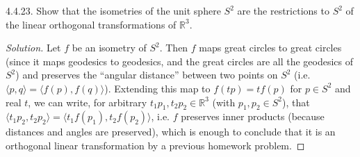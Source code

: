 \documentclass[10pt]{scrartcl}
\providecommand{\RR}{\mathbb R}
\newenvironment{soln}{\begin{proof}[Solution]}{\end{proof}}
\begin{document}
\begin{problem*}4.4.23.
	Show that the isometries of the unit sphere $S^2$ are the restrictions
	to $S^2$ of the linear orthogonal transformations of $\RR^3$.
\end{problem*}

\begin{soln}
	Let $f$ be an isometry of $S^2$.
	Then $f$ maps great circles to great circles
	(since it maps geodesics to geodesics,
	and the great circles are all the geodesics of $S^2$)
	and preserves the ``angular distance'' between two points on $S^2$
	(i.e. $\langle p,q\rangle = \langle f(p),f(q)\rangle$).
	Extending this map to $f(tp) = tf(p)$ for $p\in S^2$ and real $t$,
	we can write, for arbitrary $t_1p_1,t_2p_2\in\RR^3$
	(with $p_1,p_2\in S^2$), that $\langle t_1p_2,t_2p_2\rangle =
	\langle t_1f(p_1),t_2f(p_2)\rangle$, i.e. $f$ preserves
	inner products (because distances and angles are preserved),
	which is enough to conclude that it is
	an orthogonal linear transformation by a previous homework problem. 
\end{soln}
\end{document}
